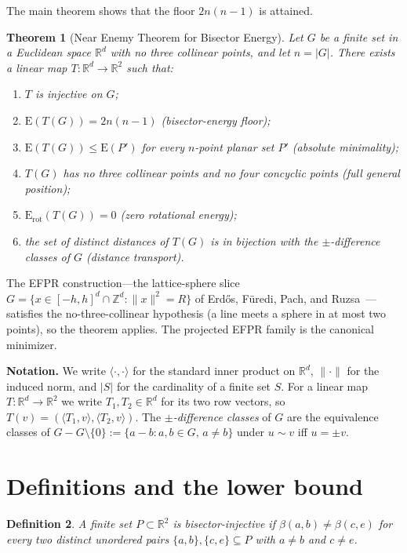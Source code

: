 \documentclass[12pt]{article}
\newtheorem{theorem}{Theorem}
\newtheorem{definition}[theorem]{Definition}
\newcommand{\R}{\mathbb{R}}
\newcommand{\Z}{\mathbb{Z}}
\newcommand{\E}{\mathrm{E}}         %
\newcommand{\Erot}{\mathrm{E}_{\mathrm{rot}}} %
\newcommand{\bis}[2]{\beta(#1,#2)}  %
\newcommand{\ip}[2]{\langle #1,#2\rangle}
\newcommand{\norm}[1]{\|#1\|}
\begin{document}
The main theorem shows that the floor $2n(n-1)$ is attained.

\begin{theorem}[Near Enemy Theorem for Bisector Energy]
\label{thm:main}
Let $G$ be a finite set in a Euclidean space $\R^d$ with no three collinear
points, and let $n=|G|$.  There exists a linear map
$T\colon\R^d\to\R^2$ such that:
\begin{enumerate}
  \item[\rm(a)] $T$ is injective on $G$;
  \item[\rm(b)] $\E(T(G)) = 2n(n-1)$ \emph{(bisector-energy floor)};
  \item[\rm(c)] $\E(T(G))\le \E(P')$ for every $n$-point planar set $P'$
        \emph{(absolute minimality)};
  \item[\rm(d)] $T(G)$ has no three collinear points and no four concyclic
        points \emph{(full general position)};
  \item[\rm(e)] $\Erot(T(G))=0$ \emph{(zero rotational energy)};
  \item[\rm(f)] the set of distinct distances of $T(G)$ is in bijection with
        the $\pm$-difference classes of $G$
        \emph{(distance transport)}.
\end{enumerate}
\end{theorem}

The EFPR construction---the lattice-sphere slice $G=\{x\in[-h,h]^d\cap\Z^d :
\norm{x}^2=R\}$ of Erd\H{o}s, F\"{u}redi, Pach, and Ruzsa~\cite{EFPR93}---satisfies
the no-three-collinear hypothesis (a line meets a sphere in at most two points),
so the theorem applies.  The projected EFPR family is the canonical minimizer.

\medskip
\noindent\textbf{Notation.}
We write $\ip{\cdot}{\cdot}$ for the standard inner product on $\R^d$,
$\norm{\cdot}$ for the induced norm, and $|S|$ for the cardinality of a
finite set $S$.
For a linear map $T\colon\R^d\to\R^2$ we write $T_1,T_2\in\R^d$ for its
two row vectors, so $T(v)=({\ip{T_1}{v}},{\ip{T_2}{v}})$.
The \emph{$\pm$-difference classes} of $G$ are the equivalence classes of
$G{-}G\setminus\{0\}:=\{a-b:a,b\in G,\,a\ne b\}$ under $u\sim v$ iff $u=\pm v$.

\section{Definitions and the lower bound}

\begin{definition}
A finite set $P\subset\R^2$ is \emph{bisector-injective} if
$\bis{a}{b}\ne\bis{c}{e}$ for every two distinct unordered pairs
$\{a,b\},\{c,e\}\subseteq P$ with $a\ne b$ and $c\ne e$.
\end{definition}
\end{document}

